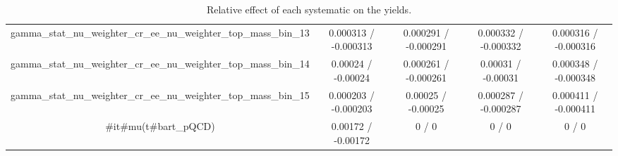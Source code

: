 \documentclass[10pt]{article}
\begin{document}
\begin{table}[htbp]
\begin{center}
\begin{tabular}{|c|c|c|c|c|}
  gamma_stat_nu_weighter_cr_ee_nu_weighter_top_mass_bin_13 & 0.000313 / -0.000313 & 0.000291 / -0.000291 & 0.000332 / -0.000332 & 0.000316 / -0.000316 \\ 
  gamma_stat_nu_weighter_cr_ee_nu_weighter_top_mass_bin_14 & 0.00024 / -0.00024 & 0.000261 / -0.000261 & 0.00031 / -0.00031 & 0.000348 / -0.000348 \\ 
  gamma_stat_nu_weighter_cr_ee_nu_weighter_top_mass_bin_15 & 0.000203 / -0.000203 & 0.00025 / -0.00025 & 0.000287 / -0.000287 & 0.000411 / -0.000411 \\ 
  #it{#mu}(t#bar{t}_{pQCD}) & 0.00172 / -0.00172 & 0 / 0 & 0 / 0 & 0 / 0 \\ 
\hline 
\end{tabular} 
\caption{Relative effect of each systematic on the yields.} 
\end{center} 
\end{table} 
\end{document}

